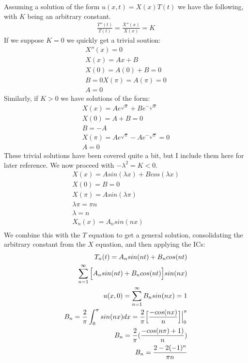 \documentclass{article}
\begin{document}
Assuming a solution of the form $u(x,t) = X(x)T(t)$ we have the following, with $K$ being an arbitrary constant.
\begin{equation}
\begin{aligned}
\frac{T''(t)}{T(t)} = \frac{X''(x)}{X(x)} = K
\end{aligned}
\end{equation}
If we suppose $K=0$ we quickly get a trivial soution:
\begin{equation}
\begin{aligned}
X''(x) = 0\\
X(x) = Ax + B\\
X(0) = A(0) + B=0\\
B=0
X(\pi) = A(\pi) = 0\\
A = 0
\end{aligned}
\end{equation}
Similarly, if $K>0$ we have solutions of the form:
\begin{equation}
\begin{aligned}
X(x) = Ae^{\sqrt{x}} + Be^{-\sqrt{x}}\\
X(0) = A + B = 0\\
B = -A\\
X(\pi) = Ae^{\sqrt{\pi}} -Ae^{-\sqrt{\pi}} = 0\\
A = 0
\end{aligned}
\end{equation}
These trivial solutions have been covered quite a bit, but I include them here for later reference. We now proceed with $-\lambda^2 = K < 0$.
\begin{equation}
\begin{aligned}
X(x) = Asin(\lambda x) + Bcos(\lambda x)\\
X(0) = B = 0\\
X(\pi) = Asin(\lambda \pi)\\
\lambda\pi = \pi n\\
\lambda = n\\
X_n(x) = A_nsin(nx)\\
\end{aligned}
\end{equation}
We combine this with the $T$ equation to get a general solution, consolidating the arbitrary constant from the $X$ equation, and then applying the ICs:
\begin{equation}
\begin{aligned}
T_n(t) = A_nsin(nt) + B_ncos(nt)\\
\sum^{\infty}_{n=1}\Big{[}A_nsin(nt) + B_ncos(nt)\Big{]}sin(nx)\\
u(x,0) = \sum^{\infty}_{n=1}B_nsin(nx) = 1\\
B_n = \frac{2}{\pi}\int_0^\pi sin(nx)dx = \frac{2}{\pi}\Big{[}\frac{-cos(nx)}{n}\Big{]}\Big{|}^\pi_0\\
 B_n = \frac{2}{\pi}(\frac{-cos(n\pi) + 1)}{n})\\
 B_n = \frac{2- 2(-1)^n}{\pi n}
\end{aligned}
\end{equation}
\end{document}
